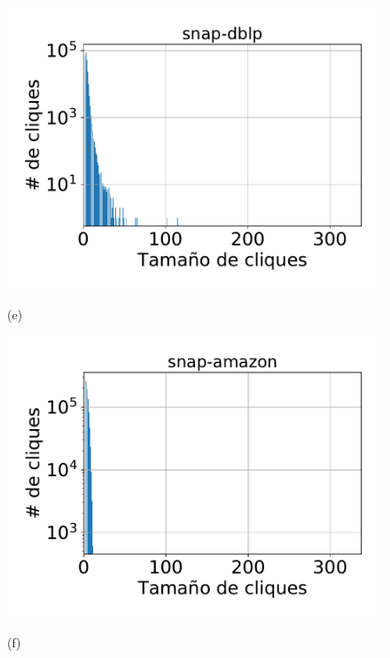 \begin{figure}
{    	\begin{minipage}{1\textwidth}
    		\centering
    		\begin{minipage}{0.45\textwidth}
    			\centering
    			\includegraphics[width=1\linewidth]{img/cliqueDist2/snap-dblp.pdf}
    			
    			(e)
    		\end{minipage}
    		\begin{minipage}{0.45\textwidth}
    			\centering
    			\includegraphics[width=1\linewidth]{img/cliqueDist2/snap-amazon.pdf}
    			
    			(f)
    		\end{minipage}  
    	\end{minipage}
    	
}
\end{figure}
